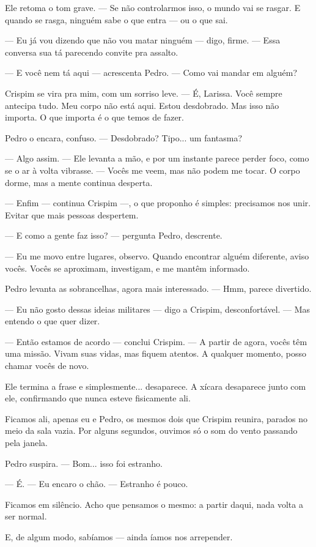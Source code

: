 Ele retoma o tom grave.  
— Se não controlarmos isso, o mundo vai se rasgar.  
E quando se rasga, ninguém sabe o que entra — ou o que sai.

— Eu já vou dizendo que não vou matar ninguém — digo, firme.  
— Essa conversa sua tá parecendo convite pra assalto.

— E você nem tá aqui — acrescenta Pedro. — Como vai mandar em alguém?

Crispim se vira pra mim, com um sorriso leve.  
— É, Larissa. Você sempre antecipa tudo.  
Meu corpo não está aqui. Estou desdobrado.  
Mas isso não importa. O que importa é o que temos de fazer.

Pedro o encara, confuso.  
— Desdobrado? Tipo... um fantasma?

— Algo assim. — Ele levanta a mão, e por um instante parece perder foco, como se o ar à volta vibrasse.  
— Vocês me veem, mas não podem me tocar.  
O corpo dorme, mas a mente continua desperta.

— Enfim — continua Crispim —, o que proponho é simples: precisamos nos unir.
Evitar que mais pessoas despertem.  

— E como a gente faz isso? — pergunta Pedro, descrente.

— Eu me movo entre lugares, observo.  
Quando encontrar alguém diferente, aviso vocês.  
Vocês se aproximam, investigam, e me mantêm informado.

Pedro levanta as sobrancelhas, agora mais interessado.  
— Hmm, parece divertido.  

— Eu não gosto dessas ideias militares — digo a Crispim, desconfortável. — Mas entendo o que quer dizer.

— Então estamos de acordo — conclui Crispim. — A partir de agora, vocês têm uma missão.  
Vivam suas vidas, mas fiquem atentos.  
A qualquer momento, posso chamar vocês de novo.

Ele termina a frase e simplesmente... desaparece.  
A xícara desaparece junto com ele, confirmando que nunca esteve fisicamente ali.

Ficamos ali, apenas eu e Pedro, os mesmos dois que Crispim reunira, parados no meio da sala vazia.
Por alguns segundos, ouvimos só o som do vento passando pela janela.

Pedro suspira.  
— Bom... isso foi estranho.

— É. — Eu encaro o chão. — Estranho é pouco.

Ficamos em silêncio.  
Acho que pensamos o mesmo:  
a partir daqui, nada volta a ser normal.

E, de algum modo, sabíamos — ainda íamos nos arrepender.

